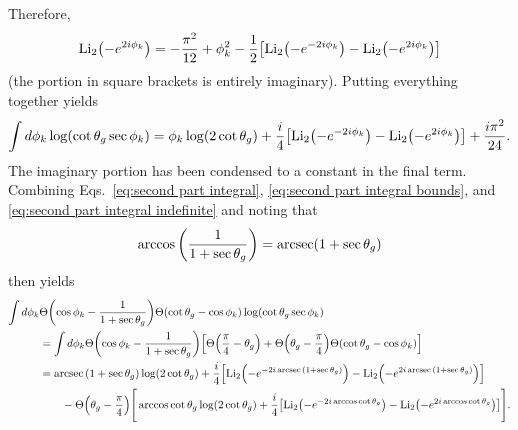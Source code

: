 \documentclass[11pt,twoside,reqno]{amsart}
\theoremstyle{plain}
\theoremstyle{remark}
\theoremstyle{definition}
\theoremstyle{remark}
\theoremstyle{definition}
\theoremstyle{definition}
\newcommand{\Li}{\mathrm{Li}}
\begin{document}
	Therefore,
	\begin{equation}
		\Li_2\qty(-e^{2i\phi_k}) = -\frac{\pi^2}{12} + \phi_k^2 - \frac{1}{2}\qty[\Li_2\qty(-e^{-2i\phi_k}) - \Li_2\qty(-e^{2i\phi_k})]
	\end{equation}
	(the portion in square brackets is entirely imaginary). Putting everything together yields
	\begin{equation}\label{eq:second part integral indefinite}
		\int d\phi_k \log(\cot\theta_g \sec\phi_k ) = \phi_k \log(2\cot\theta_g) + \frac{i}{4}\qty[\Li_2\qty(-e^{-2i\phi_k}) - \Li_2\qty(-e^{2i\phi_k})] + \frac{i\pi^2}{24}.
	\end{equation}
	The imaginary portion has been condensed to a constant in the final term. Combining Eqs.~\ref{eq:second part integral}, \ref{eq:second part integral bounds}, and \ref{eq:second part integral indefinite} and noting that
	\begin{equation}
		\arccos\qty(\frac{1}{1+\sec\theta_g}) = \arcsec(1 + \sec\theta_g)
	\end{equation}then yields
	\begin{equation}
	\begin{aligned}
		\int d\phi_k &\Theta\qty(\cos\phi_k - \frac{1}{1+\sec\theta_g})\Theta(\cot\theta_g - \cos\phi_k) \log(\cot\theta_g \sec\phi_k ) \\
		&= \int d\phi_k \Theta\qty(\cos\phi_k - \frac{1}{1+\sec\theta_g})\qty[\Theta\qty(\frac{\pi}{4} - \theta_g) + \Theta\qty(\theta_g - \frac{\pi}{4})\Theta(\cot\theta_g - \cos\phi_k)] \\
		&= \arcsec\qty(1 + \sec\theta_g) \log(2\cot\theta_g) + \frac{i}{4}\qty[\Li_2\qty(-e^{-2i\arcsec\qty(1 + \sec\theta_g)}) - \Li_2\qty(-e^{2i\arcsec\qty(1 + \sec\theta_g)})] \\
		&\qquad- \Theta\qty(\theta_g - \frac{\pi}{4})\Bigg[ \arccos\cot\theta_g \log(2\cot\theta_g) + \frac{i}{4}\qty[\Li_2\qty(-e^{-2i\arccos\cot\theta_g}) - \Li_2\qty(-e^{2i\arccos\cot\theta_g})] \Bigg].
	\end{aligned}
	\end{equation}
\end{document}
